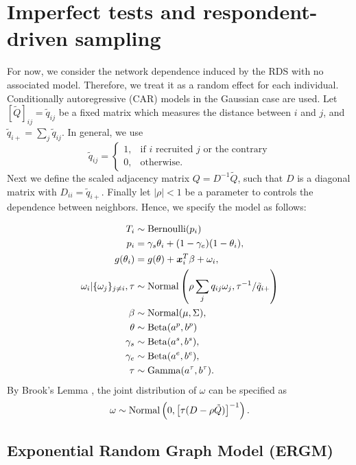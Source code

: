\section{Imperfect tests and respondent-driven sampling}

For now, we consider the network dependence induced by the RDS with no
associated model. Therefore, we treat it as a random effect for
each individual. Conditionally autoregressive (CAR) models in the
Gaussian case are used. Let $[\tilde{Q}]_{ij} = \tilde{q}_{ij}$ be a fixed matrix which measures the distance between $i$
and $j$, and $\tilde{q}_{i+} = \sum_{j} \tilde{q}_{ij}$. In general, we use
$$
\tilde{q}_{ij} = \begin{cases}
  1, &\text{if } i \text{ recruited } j \text{ or the contrary} \\
  0, &\text{otherwise.} 
\end{cases}
$$
Next we define the scaled adjacency matrix $Q = D^{-1}\tilde{Q}$, such that $D$
is a diagonal matrix with $D_{ii} = \tilde{q}_{i+}$. Finally let $|\rho| < 1$ be a
parameter to controls the dependence between neighbors. Hence, we specify the
model as follows:

\begin{equation}
  \begin{aligned}
    T_i &\sim \operatorname{Bernoulli}(p_i) \\
    p_i &= \gamma_s\theta_i + (1-\gamma_e)(1 - \theta_i),  \\
    g(\theta_i) &= g(\theta) + \boldsymbol{x}_i^T\beta + \omega_i,  \\
    \omega_i|\{\omega_j\}_{j\neq i}, \tau &\sim \operatorname{Normal}\left(\rho\sum_j q_{ij}\omega_j, \tau^{-1}/\tilde{q}_{i+}\right) \\
    \beta &\sim \operatorname{Normal}(\mu, \Sigma), \\ 
    \theta &\sim \operatorname{Beta}(a^p, b^p) \\
    \gamma_s &\sim \operatorname{Beta}(a^s, b^s), \\
    \gamma_e &\sim \operatorname{Beta}(a^e, b^e), \\  
    \tau &\sim \operatorname{Gamma}(a^{\tau}, b^{\tau}).
  \end{aligned}  
\end{equation}
By Brook's Lemma \cite[]{brook1964distinction}, the joint distribution of
$\omega$ can be specified as 
$$
\omega \sim \operatorname{Normal}\left(0, \left[\tau (D - \rho \tilde{Q})\right]^{-1}\right).
$$

\subsection{Exponential Random Graph Model (ERGM)}


